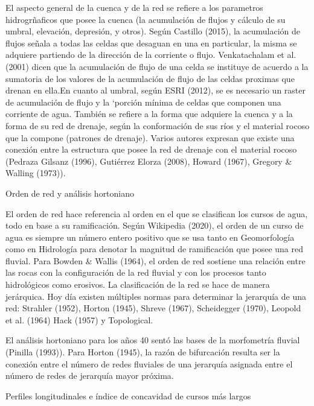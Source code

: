 \documentclass[11pt,]{article}
\begin{document}
El aspecto general de la cuenca y de la red se refiere a los parametros
hidrogrñaficos que posee la cuenca (la acumulación de flujos y cálculo
de su umbral, elevación, depresión, y otros). Según Castillo (2015), la
acumulación de flujos señala a todas las celdas que desaguan en una en
particular, la misma se adquiere partiendo de la dirección de la
corriente o flujo. Venkatachalam et al. (2001) dicen que la acumulación
de flujo de una celda se instituye de acuerdo a la sumatoria de los
valores de la acumulación de flujo de las celdas proximas que drenan en
ella.En cuanto al umbral, según ESRI (2012), se es necesario un raster
de acumulación de flujo y la `porción mínima de celdas que componen una
corriente de agua. También se refiere a la forma que adquiere la cuenca
y a la forma de su red de drenaje, según la conformación de sus ríos y
el material rocoso que la compone (patrones de drenaje). Varios autores
expresan que existe una conexión entre la estructura que posee la red de
drenaje con el material rocoso (Pedraza Gilsanz (1996), Gutiérrez Elorza
(2008), Howard (1967), Gregory \& Walling (1973)).

Orden de red y análisis hortoniano

El orden de red hace referencia al orden en el que se clasifican los
cursos de agua, todo en base a su ramificación. Según Wikipedia (2020),
el orden de un curso de agua es siempre un número entero positivo que se
usa tanto en Geomorfología como en Hidrología para denotar la magnitud
de ramificación que posee una red fluvial. Para Bowden \& Wallis (1964),
el orden de red sostiene una relación entre las rocas con la
configuración de la red fluvial y con los procesos tanto hidrológicos
como erosivos. La clasificación de la red se hace de manera jerárquica.
Hoy día existen múltiples normas para determinar la jerarquía de una
red: Strahler (1952), Horton (1945), Shreve (1967), Scheidegger (1970),
Leopold et al. (1964) Hack (1957) y Topological.

El análisis hortoniano para los años 40 sentó las bases de la
morfometría fluvial (Pinilla (1993)). Para Horton (1945), la razón de
bifurcación resulta ser la conexión entre el número de redes fluviales
de una jerarquía asignada entre el número de redes de jerarquía mayor
próxima.

Perfiles longitudinales e índice de concavidad de cursos más largos
\end{document}
